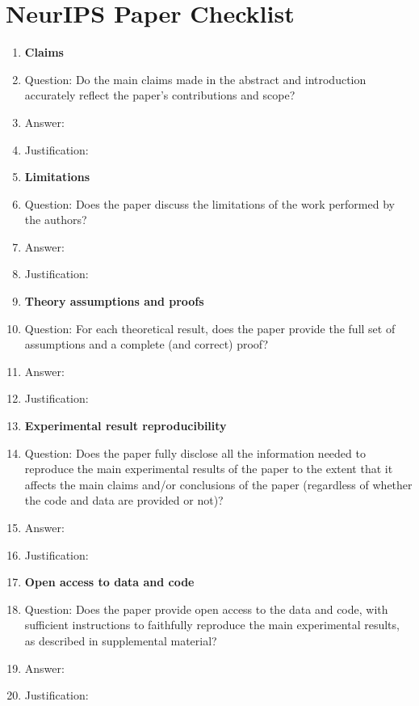 \section*{NeurIPS Paper Checklist}

\begin{enumerate}

\item {\bf Claims}
    \item[] Question: Do the main claims made in the abstract and introduction accurately reflect the paper's contributions and scope?
    \item[] Answer: \answerTODO{}
    \item[] Justification: \justificationTODO{}

\item {\bf Limitations}
    \item[] Question: Does the paper discuss the limitations of the work performed by the authors?
    \item[] Answer: \answerTODO{}
    \item[] Justification: \justificationTODO{}

\item {\bf Theory assumptions and proofs}
    \item[] Question: For each theoretical result, does the paper provide the full set of assumptions and a complete (and correct) proof?
    \item[] Answer: \answerTODO{}
    \item[] Justification: \justificationTODO{}

    \item {\bf Experimental result reproducibility}
    \item[] Question: Does the paper fully disclose all the information needed to reproduce the main experimental results of the paper to the extent that it affects the main claims and/or conclusions of the paper (regardless of whether the code and data are provided or not)?
    \item[] Answer: \answerTODO{}
    \item[] Justification: \justificationTODO{}

\item {\bf Open access to data and code}
    \item[] Question: Does the paper provide open access to the data and code, with sufficient instructions to faithfully reproduce the main experimental results, as described in supplemental material?
    \item[] Answer: \answerTODO{}
    \item[] Justification: \justificationTODO{}


\end{enumerate}
